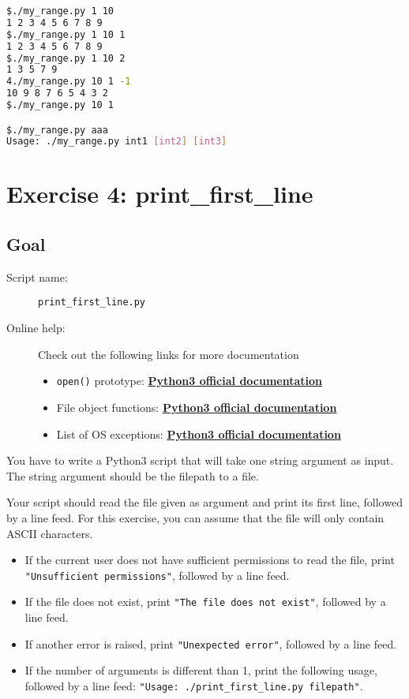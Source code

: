 \documentclass[12pt]{article}
\let\oldhref\href
\renewcommand{\href}[2]{\oldhref{#1}{\bfseries#2}}
\begin{document}
\begin{lstlisting}[language=bash]
$./my_range.py 1 10
1 2 3 4 5 6 7 8 9
$./my_range.py 1 10 1
1 2 3 4 5 6 7 8 9
$./my_range.py 1 10 2
1 3 5 7 9
4./my_range.py 10 1 -1
10 9 8 7 6 5 4 3 2
$./my_range.py 10 1

$./my_range.py aaa
Usage: ./my_range.py int1 [int2] [int3]
\end{lstlisting}

\section{Exercise 4: print\_first\_line}
\subsection{Goal}

\begin{description}
        \item[Script name:] \texttt{print\_first\_line.py}
        \item[Online help:] Check out the following links for more documentation
	\begin{itemize}
		\item \texttt{open()} prototype: \href{https://docs.python.org/3/library/functions.html\#open}{Python3 official documentation}
		\item File object functions: \href{https://docs.python.org/3.5/library/io.html\#i-o-base-classes}{Python3 official documentation}
		\item List of OS exceptions: \href{https://docs.python.org/3.5/library/exceptions.html\#os-exceptions}{Python3 official documentation}
	\end{itemize}
\end{description}

You have to write a Python3 script that will take one string argument as input. The string argument should be the filepath to a file.

Your script should read the file given as argument and print its first line, followed by a line feed. For this exercise, you can assume that the file will only contain ASCII characters.

\begin{itemize}
\item If the current user does not have sufficient permissions to read the file, print \texttt{"Unsufficient permissions"}, followed by a line feed.

\item If the file does not exist, print \texttt{"The file does not exist"}, followed by a line feed.

\item If another error is raised, print \texttt{"Unexpected error"}, followed by a line feed.

\item If the number of arguments is different than 1, print the following usage, followed by a line feed: \texttt{"Usage: ./print\_first\_line.py filepath"}.
\end{itemize}
\end{document}
